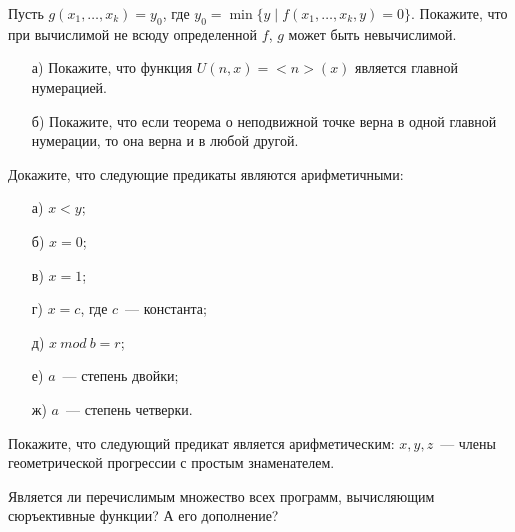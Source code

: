 \setcounter{curtask}{27}


\newcommand{\dom}[2]{\left[\frac{#1}{#2}\right]}

\begin{task}
    Пусть $g(x_1, \dots, x_k) = y_0$, где $y_0 = \min \{y \mid f(x_1, \dots, x_k, y) = 0\}$. Покажите, что при вычислимой не всюду
    определенной $f$, $g$ может быть невычислимой.
\end{task}

\begin{task}
    \begin{enumerate}[topsep = 0pt, itemsep = -1ex]
        \item[а)] Покажите, что функция $U(n, x) = {<}n{>}(x)$ является главной нумерацией.
        \item[б)] Покажите, что если теорема о неподвижной точке верна в одной главной нумерации, то она верна и в любой другой.
	\end{enumerate}
\end{task}

\begin{task}
    Докажите, что следующие предикаты являются арифметичными:
    \begin{enumerate}[topsep = 0pt, itemsep = -1ex]
        \item[а)] $x < y$;
        \item[б)] $x = 0$;
        \item[в)] $x = 1$;
        \item[г)] $x = c$, где $c$~--- константа;
        \item[д)] $x~mod~b = r$;
        \item[е)] $a$~--- степень двойки;
        \item[ж)] $a$~--- степень четверки.
	\end{enumerate}
\end{task}

\begin{task}
    Покажите, что следующий предикат является арифметическим: $x, y, z$~--- члены
    геометрической прогрессии с простым знаменателем. 
\end{task}

\begin{task}
    Является ли перечислимым множество всех программ, вычисляющим сюръективные функции? А его дополнение?
\end{task}




